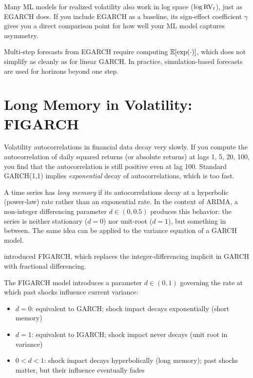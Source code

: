 \begin{projectconnection}
Many ML models for realized volatility also work in log space ($\log \operatorname{RV}_t$), just as
EGARCH does. If you include EGARCH as a baseline, its sign-effect coefficient $\gamma$
gives you a direct comparison point for how well your ML model captures asymmetry.
\end{projectconnection}

\begin{warning}
Multi-step forecasts from EGARCH require computing $\mathbb{E}[\exp(\cdot)]$, which does
not simplify as cleanly as for linear GARCH. In practice, simulation-based forecasts
are used for horizons beyond one step.
\end{warning}


\section{Long Memory in Volatility: FIGARCH}
\label{sec:figarch}

Volatility autocorrelations in financial data decay very slowly. If you compute the
autocorrelation of daily squared returns (or absolute returns) at lags 1, 5, 20,
100, you find that the autocorrelation is still positive even at lag 100. Standard
GARCH(1,1) implies \emph{exponential} decay of autocorrelations, which is too fast.

\begin{prereq}
A time series has \emph{long memory} if its autocorrelations decay at a hyperbolic
(power-law) rate rather than an exponential rate. In the context of ARIMA, a
non-integer differencing parameter $d \in (0, 0.5)$ produces this behavior: the
series is neither stationary ($d = 0$) nor unit-root ($d = 1$), but something in
between. The same idea can be applied to the variance equation of a GARCH model.
\end{prereq}

\citet{baillie1996} introduced FIGARCH, which replaces the integer-differencing
implicit in GARCH with fractional differencing.

\begin{definition}
\label{def:figarch-d}
The FIGARCH model introduces a parameter $d \in (0, 1)$ governing the rate at which
past shocks influence current variance:
%
\begin{itemize}[nosep]
  \item $d = 0$: equivalent to GARCH; shock impact decays exponentially (short
        memory)
  \item $d = 1$: equivalent to IGARCH; shock impact never decays (unit root in
        variance)
  \item $0 < d < 1$: shock impact decays hyperbolically (long memory); past shocks
        matter, but their influence eventually fades
\end{itemize}
\end{definition}

